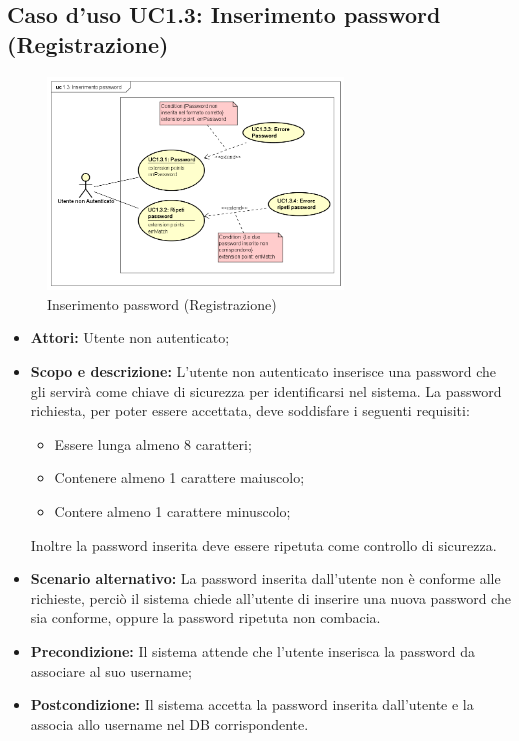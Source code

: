 \documentclass[12pt,a4paper,titlepage]{article}
\begin{document}
	\subsection{Caso d'uso UC1.3: Inserimento password (Registrazione)}
	\label{UC1.3}
	\begin{figure}[H]
		\centering
		\includegraphics[width=0.7\textwidth]{UseCase/InserimentoPassword}
		\caption{Inserimento password (Registrazione)}
	\end{figure}
	\begin{itemize}
		\item \textbf{Attori: }Utente non autenticato;
		\item \textbf{Scopo e descrizione: } L'utente non autenticato inserisce una password che gli servirà come chiave di sicurezza per identificarsi nel sistema. La password richiesta, per poter essere accettata, deve soddisfare i seguenti requisiti: 
		\begin{itemize}
			\item Essere lunga almeno 8 caratteri; 
			\item Contenere almeno 1 carattere maiuscolo; 
			\item Contere almeno 1 carattere minuscolo;
		\end{itemize}
		Inoltre la password inserita deve essere ripetuta come controllo di sicurezza.
		\item \textbf{Scenario alternativo: }La password inserita dall'utente non è conforme alle richieste, perciò il sistema chiede all'utente di inserire una nuova password che sia conforme, oppure la password ripetuta non combacia.
		\item \textbf{Precondizione: }Il sistema attende che l'utente inserisca la password da associare al suo username;
		\item \textbf{Postcondizione: }Il sistema accetta la password inserita dall'utente e la associa allo username nel DB corrispondente.
	\end{itemize}
\end{document}
